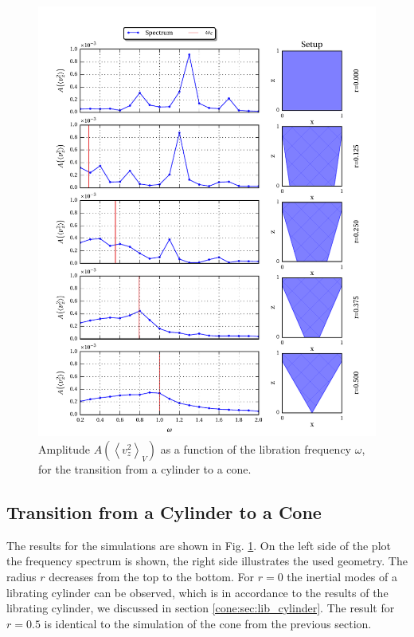 \clearpage

\begin{figure}[!pt]
  \centering
  \includegraphics{gfx/cone/transition/transition.pdf}
  \caption{\label{fig:cone:transition}
      Amplitude $A\left(\left<v^2_z\right>_V\right)$ as a function of the libration frequency $\omega$,
      for the transition from a cylinder to a cone.
  }
\end{figure}

\clearpage
\subsection{Transition from a Cylinder to a Cone }

The results for the simulations are shown in Fig. \ref{fig:cone:transition}.
On the left side of the plot  the frequency spectrum is shown, the right side illustrates the used geometry.
The radius $r$ decreases from the top to the bottom.
For $r=0$  the inertial modes of a librating cylinder can be observed, which is in accordance
to the results of the librating  cylinder, we discussed in section \ref{cone:sec:lib_cylinder}.
The result for $r=0.5$ is identical to the simulation of the cone from the previous section.

